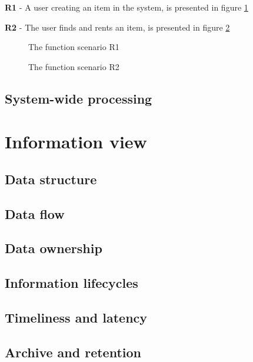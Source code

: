 \documentclass[a4paper,11pt]{report}
\begin{document}
\textbf{R1} - A user creating an item in the system, is presented in figure
\ref{fig:r1-sequence}

\textbf{R2} - The user finds and rents an item, is presented in figure
\ref{fig:r2-sequence}

\begin{figure}
    \caption{The function scenario R1}
    \label{fig:r1-sequence}
\end{figure}

\begin{figure}
    \caption{The function scenario R2}
    \label{fig:r2-sequence}
\end{figure}


\subsection{System-wide processing}
\label{sec:syst-wide-proc}


\section{Information view}
\label{cha:information-view}


\subsection{Data structure}
\label{sec:data-structure}


\subsection{Data flow}
\label{sec:data-flow}


\subsection{Data ownership}
\label{sec:data-ownership}


\subsection{Information lifecycles}
\label{sec:inform-lifecycl}


\subsection{Timeliness and latency}
\label{sec:timeliness-latency}


\subsection{Archive and retention}
\label{sec:archive-retention}
\end{document}
